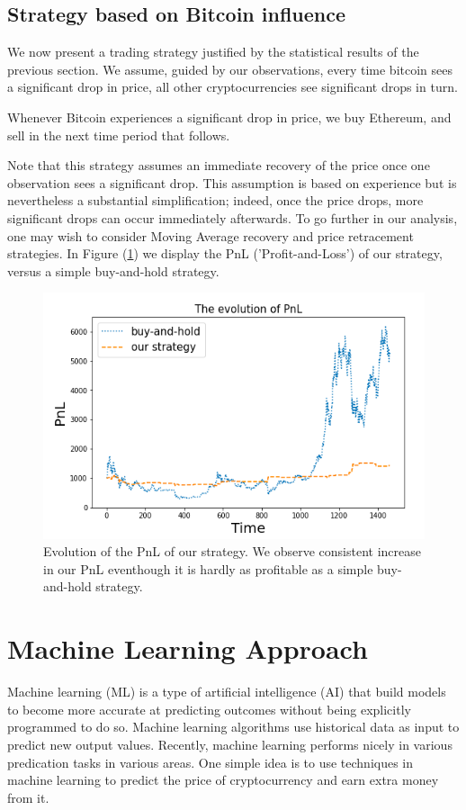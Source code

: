 \documentclass[twoside]{report}
\begin{document}
\begin{spacing}{1}
\subsection{Strategy based on Bitcoin influence}

We now present a trading strategy justified by the statistical results of the previous section. We assume, guided by our observations, every time bitcoin sees a significant drop in price, all other cryptocurrencies see significant drops in turn. \begin{strategy}
Whenever Bitcoin experiences a significant drop in price, we buy Ethereum, and sell in the next time period that follows.
\end{strategy} 
Note that this strategy assumes an immediate recovery of the price once one observation sees a significant drop. This assumption is based on experience but is nevertheless a substantial simplification; indeed, once the price drops, more significant drops can occur immediately afterwards. To go further in our analysis, one may wish to consider Moving Average recovery and price retracement strategies. In Figure (\ref{fig:backtested_strategy_2}) we display the PnL ('Profit-and-Loss') of our strategy, versus a simple buy-and-hold strategy. 

\begin{figure}[!htbp]
    \centering
    \includegraphics[width=0.8\linewidth]{Causality_between_time_series/backtested_strategy_2.png}
    \caption{Evolution of the PnL of our strategy. We observe consistent increase in our PnL eventhough it is hardly as profitable as a simple buy-and-hold strategy.}
    \label{fig:backtested_strategy_2}
\end{figure}



\section{Machine Learning Approach}
Machine learning (ML) is a type of artificial intelligence (AI) that build models to become more accurate at predicting outcomes without being explicitly programmed to do so. Machine learning algorithms use historical data as input to predict new output values. Recently, machine learning performs nicely in various predication tasks in various areas. One simple idea is to use techniques in machine learning to predict the price of cryptocurrency and earn extra money from it.


\end{spacing}
\end{document}
